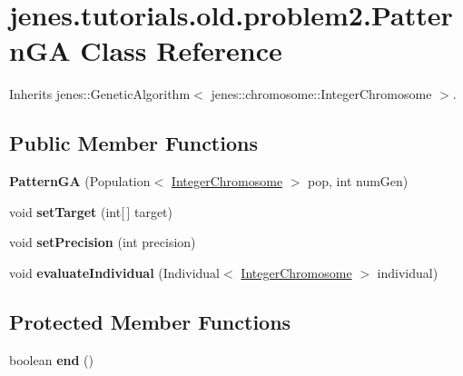 \hypertarget{classjenes_1_1tutorials_1_1old_1_1problem2_1_1_pattern_g_a}{
\section{jenes.tutorials.old.problem2.PatternGA Class Reference}
\label{classjenes_1_1tutorials_1_1old_1_1problem2_1_1_pattern_g_a}
}
Inherits jenes::GeneticAlgorithm$<$ jenes::chromosome::IntegerChromosome $>$.

\subsection*{Public Member Functions}
\begin{CompactItemize}
\item 
\hypertarget{classjenes_1_1tutorials_1_1old_1_1problem2_1_1_pattern_g_a_6c739b7abe3809978e5a2e8a41788eae}{
\textbf{PatternGA} (Population$<$ \hyperlink{classjenes_1_1chromosome_1_1_integer_chromosome}{IntegerChromosome} $>$ pop, int numGen)}
\label{classjenes_1_1tutorials_1_1old_1_1problem2_1_1_pattern_g_a_6c739b7abe3809978e5a2e8a41788eae}

\item 
\hypertarget{classjenes_1_1tutorials_1_1old_1_1problem2_1_1_pattern_g_a_cad7ad7941fbcf7fc8d555d0218886e1}{
void \textbf{setTarget} (int\mbox{[}$\,$\mbox{]} target)}
\label{classjenes_1_1tutorials_1_1old_1_1problem2_1_1_pattern_g_a_cad7ad7941fbcf7fc8d555d0218886e1}

\item 
\hypertarget{classjenes_1_1tutorials_1_1old_1_1problem2_1_1_pattern_g_a_7d2561b481b6d1f87e6a5c8f602510b0}{
void \textbf{setPrecision} (int precision)}
\label{classjenes_1_1tutorials_1_1old_1_1problem2_1_1_pattern_g_a_7d2561b481b6d1f87e6a5c8f602510b0}

\item 
\hypertarget{classjenes_1_1tutorials_1_1old_1_1problem2_1_1_pattern_g_a_90edfd135e58f9a43e3722d9e1df6f95}{
void \textbf{evaluateIndividual} (Individual$<$ \hyperlink{classjenes_1_1chromosome_1_1_integer_chromosome}{IntegerChromosome} $>$ individual)}
\label{classjenes_1_1tutorials_1_1old_1_1problem2_1_1_pattern_g_a_90edfd135e58f9a43e3722d9e1df6f95}

\end{CompactItemize}
\subsection*{Protected Member Functions}
\begin{CompactItemize}
\item 
\hypertarget{classjenes_1_1tutorials_1_1old_1_1problem2_1_1_pattern_g_a_4c05b8a32518e4fe78f66e2576014bd9}{
boolean \textbf{end} ()}
\label{classjenes_1_1tutorials_1_1old_1_1problem2_1_1_pattern_g_a_4c05b8a32518e4fe78f66e2576014bd9}

\end{CompactItemize}


